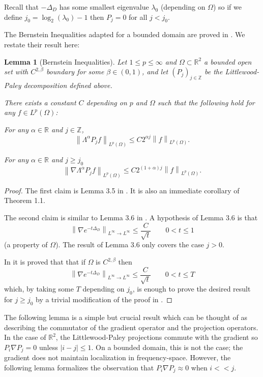 \documentclass[11pt]{amsart}
\newtheorem{lemma}[theorem]{Lemma}
\theoremstyle{remark}
\theoremstyle{definition}
\newcommand{\R}{\mathbb{R}}
\newcommand{\Z}{\mathbb{Z}}
\newcommand{\norm}[1]{\left\lVert#1\right\rVert}
\newcommand{\grad}{\nabla}
\newcommand{\Laplace}{\Delta}
\begin{document}
Recall that $-\Laplace_D$ has some smallest eigenvalue $\lambda_0$ (depending on $\Omega$) so if we define $j_0 = \log_2(\lambda_0)-1$ then $P_j = 0$ for all $j < j_0$.

The Bernstein Inequalities adapted for a bounded domain are proved in \cite{IMT.bilinear}.  We restate their result here:
\begin{lemma}[Bernstein Inequalities] \label{thm:IMT stuff}
Let $1 \leq p \leq \infty$ and $\Omega \subset \R^2$ a bounded open set with $C^{2,\beta}$ boundary for some $\beta \in (0,1)$, and let $(P_j)_{j \in \Z}$ be the Littlewood-Paley decomposition defined above.  

There exists a constant $C$ depending on $p$ and $\Omega$ such that the following hold for any $f \in L^p(\Omega)$:

For any $\alpha \in \R$ and $j \in \Z$, 
\[ \norm{\Lambda^\alpha P_j f}_{L^p(\Omega)} \leq C 2^{\alpha j} \norm{f}_{L^p(\Omega)}. \]

For any $\alpha \in \R$ and $j \geq j_0$
\[ \norm{\grad \Lambda^\alpha P_j f}_{L^p(\Omega)} \leq C 2^{(1+\alpha) j} \norm{f}_{L^p(\Omega)}. \]
\end{lemma}

\begin{proof}
The first claim is Lemma 3.5 in \cite{IMT.bilinear}.  It is also an immediate corollary of \cite{IMT.schrodinger} Theorem 1.1.  

The second claim is similar to Lemma 3.6 in \cite{IMT.bilinear}.  A hypothesis of Lemma 3.6 is that
\[ \norm{\grad e^{-t\Laplace_D}}_{L^\infty \to L^\infty} \leq \frac{C}{\sqrt{t}} \qquad 0 < t \leq 1 \]
(a property of $\Omega$).  The result of Lemma 3.6 only covers the case $j > 0$.  

In \cite{FMP} it is proved that that if $\Omega$ is $C^{2,\beta}$ then
\[ \norm{\grad e^{-t\Laplace_D}}_{L^\infty \to L^\infty} \leq \frac{C}{\sqrt{t}} \qquad 0 < t \leq T \]
which, by taking some $T$ depending on $j_0$, is enough to prove the desired result for $j \geq j_0$ by a trivial modification of the proof in \cite{IMT.bilinear}.  
\end{proof}

The following lemma is a simple but crucial result which can be thought of as describing the commutator of the gradient operator and the projection operators.  In the case of $\R^2$, the Littlewood-Paley projections commute with the gradient so $P_i \grad P_j = 0$ unless $|i-j|\leq 1$.  On a bounded domain, this is not the case; the gradient does not maintain localization in frequency-space.  However, the following lemma formalizes the observation that $P_i \grad P_j \approx 0$ when $i << j$.  
\end{document}
